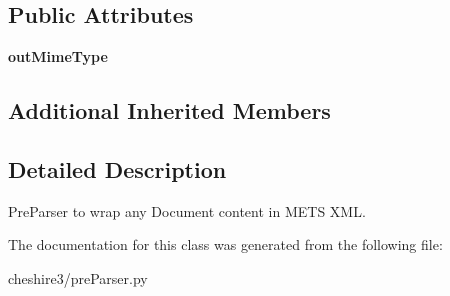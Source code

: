 \subsection*{Public Attributes}
\begin{DoxyCompactItemize}
\item 
\hypertarget{classcheshire3_1_1pre_parser_1_1_m_e_t_s_wrapping_pre_parser_ac49c8b8f60af54097c178eb602e37d1d}{{\bfseries out\-Mime\-Type}}\label{classcheshire3_1_1pre_parser_1_1_m_e_t_s_wrapping_pre_parser_ac49c8b8f60af54097c178eb602e37d1d}

\end{DoxyCompactItemize}
\subsection*{Additional Inherited Members}


\subsection{Detailed Description}
\begin{DoxyVerb}PreParser to wrap any Document content in METS XML.\end{DoxyVerb}
 

The documentation for this class was generated from the following file\-:\begin{DoxyCompactItemize}
\item 
cheshire3/pre\-Parser.\-py\end{DoxyCompactItemize}
